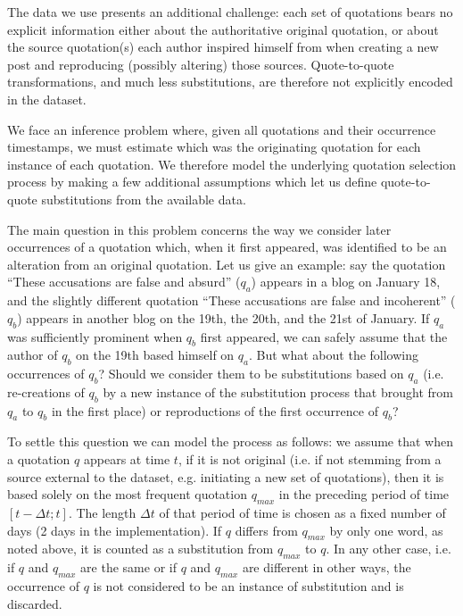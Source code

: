 The data we use presents an additional challenge: each set of quotations bears no explicit information either about the authoritative original quotation, or about the source quotation(s) each author inspired himself from when creating a new post and reproducing (possibly altering) those sources.
Quote-to-quote transformations, and much less substitutions, are therefore not explicitly encoded in the dataset.

We face an inference problem where, given all quotations and their occurrence timestamps, we must estimate which was the originating quotation for each instance of each quotation.
We therefore model the underlying quotation selection process by making a few additional assumptions which let us define quote-to-quote substitutions from the available data.

The main question in this problem concerns the way we consider later occurrences of a quotation which, when it first appeared, was identified to be an alteration from an original quotation.
Let us give an example: say the quotation ``These accusations are false and absurd'' ($q_a$) appears in a blog on January 18, and the slightly different quotation ``These accusations are false and incoherent'' ($q_b$) appears in another blog on the 19th, the 20th, and the 21st of January.
If $q_a$ was sufficiently prominent when $q_b$ first appeared, we can safely assume that the author of $q_b$ on the 19th based himself on $q_a$.
But what about the following occurrences of $q_b$?
Should we consider them to be substitutions based on $q_a$ (i.e. re-creations of $q_b$ by a new instance of the substitution process that brought from $q_a$ to $q_b$ in the first place) or reproductions of the first occurrence of $q_b$?

To settle this question we can model the process as follows: we assume that when a quotation $q$ appears at time $t$, if it is not original (i.e. if not stemming from a source external to the dataset, e.g. initiating a new set of quotations), then it is based solely on the most frequent quotation $q_{max}$ in the preceding period of time $[t - \Delta t ; t]$.
The length $\Delta t$ of that period of time is chosen as a fixed number of days (2 days in the implementation).
If $q$ differs from $q_{max}$ by only one word, as noted above, it is counted as a substitution from $q_{max}$ to $q$.
In any other case, i.e. if $q$ and $q_{max}$ are the same or if $q$ and $q_{max}$ are different in other ways, the occurrence of $q$ is not considered to be an instance of substitution and is discarded.

